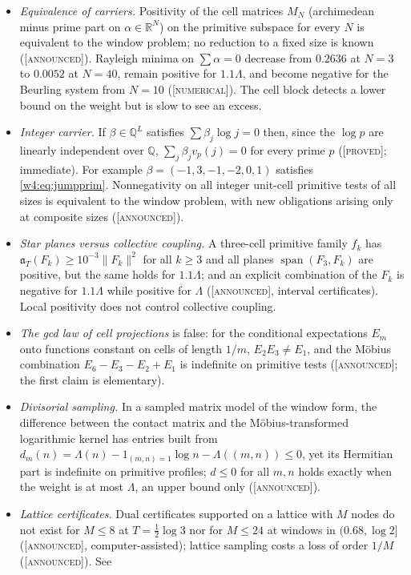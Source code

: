 \documentclass[11pt]{amsart}
\theoremstyle{definition}
\theoremstyle{remark}
\numberwithin{equation}{section}
\newcommand{\R}{\mathbb{R}}
\newcommand{\Q}{\mathbb{Q}}
\DeclareMathOperator{\spn}{span}
\newcommand{\aT}{\mathfrak{a}_T}                       %
\newcommand{\stag}[1]{\textsc{[#1]}}
\newcommand{\PROVED}{\stag{proved}}
\newcommand{\NUM}{\stag{numerical}}
\newcommand{\ANNOUNCED}{\stag{announced}}
\begin{document}
\begin{itemize}
\item \emph{Equivalence of carriers.} Positivity of the cell matrices $M_N$ (archimedean minus prime part on $\alpha\in\R^N$) on the
primitive subspace for every $N$ is equivalent to the window problem; no reduction to a fixed size is known (\ANNOUNCED). Rayleigh minima
on $\sum\alpha=0$ decrease from $0.2636$ at $N=3$ to $0.0052$ at $N=40$, remain positive for $1.1\Lambda$, and become negative for the
Beurling system from $N=10$ (\NUM). The cell block detects a lower bound on the weight but is slow to see an excess.
\item \emph{Integer carrier.} If $\beta\in\Q^L$ satisfies $\sum\beta_j\log j=0$ then, since the $\log p$ are linearly independent over
$\Q$, $\sum_j\beta_jv_p(j)=0$ for every prime $p$ (\PROVED; immediate). For example $\beta=(-1,3,-1,-2,0,1)$ satisfies \eqref{w4:eq:jumpprim}.
Nonnegativity on all integer unit-cell primitive tests of all sizes is equivalent to the window problem, with new obligations arising only
at composite sizes (\ANNOUNCED).
\item \emph{Star planes versus collective coupling.} A three-cell primitive family $f_k$ has $\aT(F_k)\ge10^{-3}\|F_k\|^2$ for all $k\ge3$ and
all planes $\spn(F_3,F_k)$ are positive, but the same holds for $1.1\Lambda$; and an explicit combination of the $F_k$ is negative for
$1.1\Lambda$ while positive for $\Lambda$ (\ANNOUNCED, interval certificates). Local positivity does not control collective coupling.
\item \emph{The gcd law of cell projections} is false: for the conditional expectations $E_m$ onto functions constant on cells of length
$1/m$, $E_2E_3\ne E_1$, and the M\"obius combination $E_6-E_3-E_2+E_1$ is indefinite on primitive tests (\ANNOUNCED; the first claim is
elementary).
\item \emph{Divisorial sampling.} In a sampled matrix model of the window form, the difference between the contact matrix and the
M\"obius-transformed logarithmic kernel has entries built from $d_m(n)=\Lambda(n)-1_{(m,n)=1}\log n-\Lambda((m,n))\le0$, yet its Hermitian part is
indefinite on primitive profiles; $d\le0$ for all $m,n$ holds exactly when the weight is at most $\Lambda$, an upper bound only
(\ANNOUNCED).
\item \emph{Lattice certificates.} Dual certificates supported on a lattice with $M$ nodes do not exist for $M\le8$ at $T=\frac12\log3$ nor for
$M\le24$ at windows in $(0.68,\log2]$ (\ANNOUNCED, computer-assisted); lattice sampling costs a loss of order $1/M$ (\ANNOUNCED). See

\end{itemize}
\end{document}
